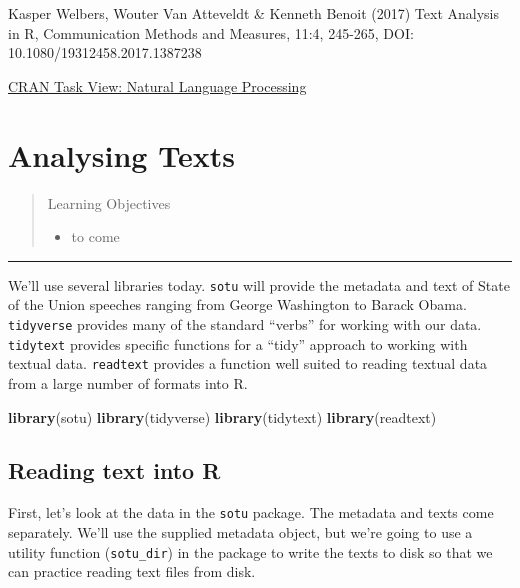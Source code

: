 \documentclass[]{book}
\newenvironment{Shaded}{\begin{snugshade}}{\end{snugshade}}
\newcommand{\KeywordTok}[1]{\textcolor[rgb]{0.13,0.29,0.53}{\textbf{#1}}}
\newcommand{\NormalTok}[1]{#1}
\providecommand{\tightlist}{%
  \setlength{\itemsep}{0pt}\setlength{\parskip}{0pt}}
\begin{document}
Kasper Welbers, Wouter Van Atteveldt \& Kenneth Benoit (2017) Text Analysis in R, Communication Methods and Measures, 11:4, 245-265, DOI: 10.1080/19312458.2017.1387238

\href{https://CRAN.R-project.org/view=NaturalLanguageProcessing}{CRAN Task View: Natural Language Processing}

\hypertarget{textanalysis}{%
\chapter{Analysing Texts}\label{textanalysis}}

\begin{quote}
Learning Objectives

\begin{itemize}
\tightlist
\item
  to come
\end{itemize}
\end{quote}

\begin{center}\rule{0.5\linewidth}{\linethickness}\end{center}

We'll use several libraries today. \texttt{sotu} will provide the metadata and text of State of the Union speeches ranging from George Washington to Barack Obama. \texttt{tidyverse} provides many of the standard ``verbs'' for working with our data. \texttt{tidytext} provides specific functions for a ``tidy'' approach to working with textual data. \texttt{readtext} provides a function well suited to reading textual data from a large number of formats into R.

\begin{Shaded}
\begin{Highlighting}[]
\KeywordTok{library}\NormalTok{(sotu)}
\KeywordTok{library}\NormalTok{(tidyverse)}
\KeywordTok{library}\NormalTok{(tidytext)}
\KeywordTok{library}\NormalTok{(readtext)}
\end{Highlighting}
\end{Shaded}

\hypertarget{reading-text-into-r}{%
\section{Reading text into R}\label{reading-text-into-r}}

First, let's look at the data in the \texttt{sotu} package. The metadata and texts come separately. We'll use the supplied metadata object, but we're going to use a utility function (\texttt{sotu\_dir}) in the package to write the texts to disk so that we can practice reading text files from disk.
\end{document}
